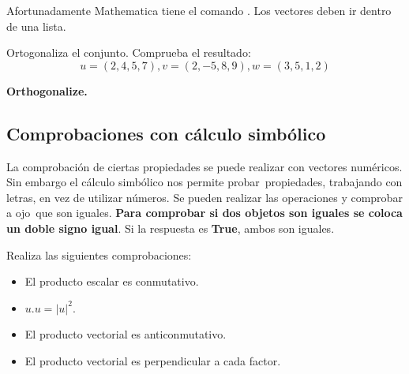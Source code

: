 \documentclass[a4paper,10pt, draft]{article}
\newcommand{\com}[1]{\textbf{\color{blue}{#1}}}
\newenvironment{ejer}{\begin{tcolorbox}[center title, title=Ejercicios,
fonttitle=\sffamily\bfseries,colback=blue!5,colframe=orange]}{\end{tcolorbox}}
\newenvironment{funciones}{\begin{tcolorbox}[center title, title=Nuevas funciones, fonttitle=\sffamily\bfseries, colback=green!5!white,colframe=red!75!black]}{\end{tcolorbox}\bigskip}
\begin{document}
Afortunadamente Mathematica tiene el comando \com{Orthogonalize[\{u,v,\dots\}]}. Los vectores deben ir dentro de una lista.
  
  
\begin{ejer}
  
  Ortogonaliza el conjunto. Comprueba el resultado:
   $$
   u=(2,4,5,7) , v=(2,-5,8,9), w=(3,5,1,2)
   $$
  
 \end{ejer} 
 
 \begin{funciones}
 
 \textbf{Orthogonalize.}
 
 
 \end{funciones}
 
 
 
  \newpage
  
  \subsection{Comprobaciones con cálculo simbólico}

La comprobación de ciertas propiedades se puede realizar con vectores numéricos. Sin embargo
el cálculo simbólico nos permite \guillemotleft probar\guillemotright\ propiedades, trabajando con letras, en vez de utilizar números. Se pueden realizar las operaciones y comprobar \guillemotleft a ojo\guillemotright\ que son iguales. \textbf{Para comprobar si dos objetos son iguales se coloca un doble signo igual}. Si la respuesta es \textbf{True}, ambos son iguales.

\begin{ejer}

Realiza las siguientes comprobaciones:

\begin{itemize}

\item El producto escalar es conmutativo.

\item $u . u =|u|^2$.

\item El producto vectorial es anticonmutativo.

\item El producto vectorial es perpendicular a cada factor.


\end{itemize}


\end{ejer}  \newpage
\end{document}
